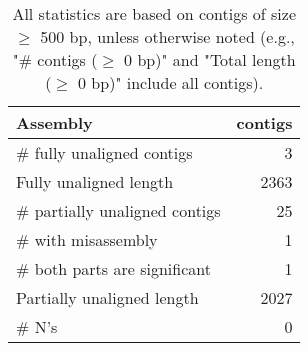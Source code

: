 \documentclass[12pt,a4paper]{article}
\begin{document}
\begin{table}[ht]
\begin{center}
\caption{All statistics are based on contigs of size $\geq$ 500 bp, unless otherwise noted (e.g., "\# contigs ($\geq$ 0 bp)" and "Total length ($\geq$ 0 bp)" include all contigs).}
\begin{tabular}{|l*{1}{|r}|}
\hline
Assembly & contigs \\ \hline
\# fully unaligned contigs & 3 \\ \hline
Fully unaligned length & 2363 \\ \hline
\# partially unaligned contigs & 25 \\ \hline
\hspace{5mm}\# with misassembly & 1 \\ \hline
\hspace{5mm}\# both parts are significant & 1 \\ \hline
Partially unaligned length & 2027 \\ \hline
\# N's & 0 \\ \hline
\end{tabular}
\end{center}
\end{table}
\end{document}
